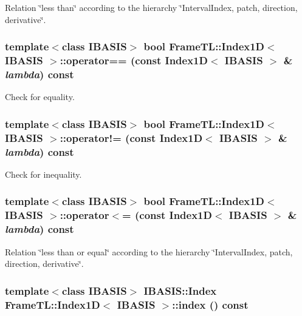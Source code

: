 Relation \char`\"{}less than\char`\"{} according to the hierarchy \char`\"{}IntervalIndex, patch, direction, derivative\char`\"{}. \hypertarget{classFrameTL_1_1Index1D_ae4f859de8325a33501146ddc6794473}{
\subsubsection[operator==]{\setlength{\rightskip}{0pt plus 5cm}template$<$class IBASIS$>$ bool {\bf FrameTL::Index1D}$<$ IBASIS $>$::operator== (const {\bf Index1D}$<$ IBASIS $>$ \& {\em lambda}) const}}
\label{classFrameTL_1_1Index1D_ae4f859de8325a33501146ddc6794473}


Check for equality. \hypertarget{classFrameTL_1_1Index1D_a966fed809d2871b7cec4eadeffb6814}{
\subsubsection[operator"!=]{\setlength{\rightskip}{0pt plus 5cm}template$<$class IBASIS$>$ bool {\bf FrameTL::Index1D}$<$ IBASIS $>$::operator!= (const {\bf Index1D}$<$ IBASIS $>$ \& {\em lambda}) const}}
\label{classFrameTL_1_1Index1D_a966fed809d2871b7cec4eadeffb6814}


Check for inequality. \hypertarget{classFrameTL_1_1Index1D_3509b3f4c7673c40da1485b3b4b77274}{
\subsubsection[operator$<$=]{\setlength{\rightskip}{0pt plus 5cm}template$<$class IBASIS$>$ bool {\bf FrameTL::Index1D}$<$ IBASIS $>$::operator$<$= (const {\bf Index1D}$<$ IBASIS $>$ \& {\em lambda}) const}}
\label{classFrameTL_1_1Index1D_3509b3f4c7673c40da1485b3b4b77274}


Relation \char`\"{}less than or equal\char`\"{} according to the hierarchy \char`\"{}IntervalIndex, patch, direction, derivative\char`\"{}. \hypertarget{classFrameTL_1_1Index1D_c7730cfbad3d3f89e1a22f7f6b8ee6b9}{
\subsubsection[index]{\setlength{\rightskip}{0pt plus 5cm}template$<$class IBASIS$>$ IBASIS::Index {\bf FrameTL::Index1D}$<$ IBASIS $>$::index () const}}
\label{classFrameTL_1_1Index1D_c7730cfbad3d3f89e1a22f7f6b8ee6b9}


